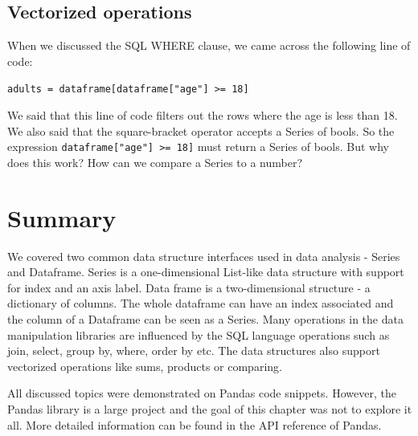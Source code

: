 \subsection{Vectorized operations}

When we discussed the SQL WHERE clause, we came across the following line of code:

\verb|adults = dataframe[dataframe["age"] >= 18]|

We said that this line of code filters out the rows where the age is less than 18.
We also said that the square-bracket operator accepts a Series of bools.
So the expression \verb|dataframe["age"] >= 18]| must return a Series of bools.
But why does this work?
How can we compare a Series to a number?


\section*{Summary} %

We covered two common data structure interfaces used in data analysis - Series and Dataframe.
Series is a one-dimensional List-like data structure with support for index and an axis label.
Data frame is a two-dimensional structure - a dictionary of columns.
The whole dataframe can have an index associated and the column of a Dataframe can be seen as a Series.
Many operations in the data manipulation libraries are influenced by the SQL language operations such as join, select,
group by, where, order by etc.
The data structures also support vectorized operations like sums, products or comparing.

All discussed topics were demonstrated on Pandas code snippets.
However, the Pandas library is a large project and the goal of this chapter was not to explore it all.
More detailed information can be found in the API reference of Pandas\cite{pandas_docs}.